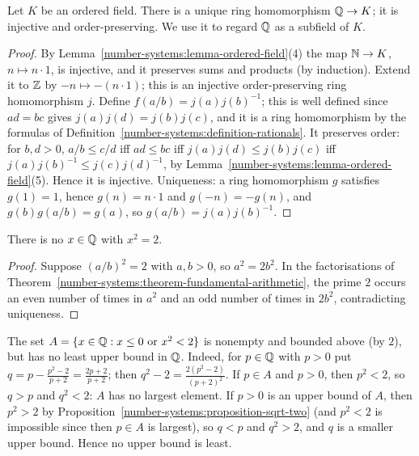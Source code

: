 \begin{proposition}\label{number-systems:proposition-rationals-initial}
Let $K$ be an ordered field. There is a unique ring homomorphism
$\mathbb{Q} \to K$; it is injective and order-preserving. We use it to regard $\mathbb{Q}$ as a
subfield of $K$.
\end{proposition}

\begin{proof}
By Lemma~\ref{number-systems:lemma-ordered-field}(4) the map $\mathbb{N} \to K$,
$n \mapsto n \cdot 1$, is injective, and it preserves sums and products (by
induction). Extend it to $\mathbb{Z}$ by $-n \mapsto -(n \cdot 1)$; this is an
injective order-preserving ring homomorphism $j$. Define
$f(a/b) = j(a) j(b)^{-1}$; this is well defined since $ad = bc$ gives
$j(a)j(d) = j(b)j(c)$, and it is a ring homomorphism by the formulas of
Definition~\ref{number-systems:definition-rationals}. It preserves order: for
$b, d > 0$, $a/b \leq c/d$ iff $ad \leq bc$ iff $j(a)j(d) \leq j(b)j(c)$ iff
$j(a)j(b)^{-1} \leq j(c)j(d)^{-1}$, by Lemma~\ref{number-systems:lemma-ordered-field}(5).
Hence it is injective. Uniqueness: a ring homomorphism $g$ satisfies
$g(1) = 1$, hence $g(n) = n \cdot 1$ and $g(-n) = -g(n)$, and
$g(b) g(a/b) = g(a)$, so $g(a/b) = j(a) j(b)^{-1}$.
\end{proof}

\begin{proposition}\label{number-systems:proposition-sqrt-two}
There is no $x \in \mathbb{Q}$ with $x^2 = 2$.
\end{proposition}

\begin{proof}
Suppose $(a/b)^2 = 2$ with $a, b > 0$, so $a^2 = 2b^2$. In the factorisations of
Theorem~\ref{number-systems:theorem-fundamental-arithmetic}, the prime $2$
occurs an even number of times in $a^2$ and an odd number of times in $2b^2$,
contradicting uniqueness.
\end{proof}

\begin{counterexample}\label{number-systems:counterexample-rationals-incomplete}
The set $A = \{x \in \mathbb{Q} : x \leq 0 \text{ or } x^2 < 2\}$ is nonempty and
bounded above (by $2$), but has no least upper bound in $\mathbb{Q}$. Indeed, for
$p \in \mathbb{Q}$ with $p > 0$ put $q = p - \frac{p^2 - 2}{p + 2} = \frac{2p + 2}{p + 2}$;
then $q^2 - 2 = \frac{2(p^2 - 2)}{(p + 2)^2}$. If $p \in A$ and $p > 0$, then
$p^2 < 2$, so $q > p$ and $q^2 < 2$: $A$ has no largest element. If $p > 0$ is an
upper bound of $A$, then $p^2 > 2$ by
Proposition~\ref{number-systems:proposition-sqrt-two} (and $p^2 < 2$ is
impossible since then $p \in A$ is largest), so $q < p$ and $q^2 > 2$, and $q$ is
a smaller upper bound. Hence no upper bound is least.
\end{counterexample}


